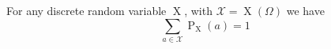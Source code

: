 For any discrete random variable $\operatorname{X}$, with $\mathcal{X} = \operatorname{X}(\Omega)$ we have
$$\sum\limits_{a \in \mathcal{X}} \operatorname{P}_{\operatorname{X}}(a) = 1$$
